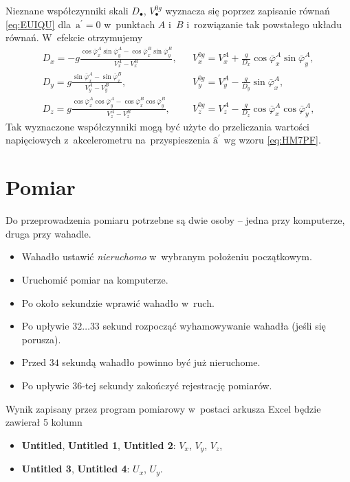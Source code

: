 \documentclass[paper=a4,DIV=12]{tmmlab}
\newcommand{\brm}[1]{\bm{\mathrm{#1}}}
\begin{document}
Nieznane współczynniki skali $D_{\bullet}$, $V_{\bullet}^{0g}$ wyznacza się
poprzez zapisanie równań \eqref{eq:EUIQU} dla~$\brm{a}^{\prime} = \brm{0}$
w~punktach $A$ i~$B$ i~rozwiązanie tak powstałego układu równań. W~efekcie
otrzymujemy
\begin{subequations}
  \label{eq:GN30K}
  \begin{align}
    & D_x = -g \frac{ \cos{\bar{\varphi}_x^A}\sin{\bar{\varphi}_y^A} -\cos{\bar{\varphi}_x^B}\sin{\bar{\varphi}_y^B} }
                    { V_x^A - V_x^B }, &
    & V_x^{0g} = V_x^A +\frac{g}{D_x} \cos{\bar{\varphi}_x^A}\sin{\bar{\varphi}_y^A}, &
    \label{eq:L8MQV}
    \\
    & D_y = g \frac{ \sin{\bar{\varphi}_x^A} - \sin{\bar{\varphi}_x^B} }
                   { V_y^A - V_y^B }, &
    & V_y^{0g} = V_y^A - \frac{g}{D_y}\sin{\bar{\varphi}_x^A}, &
    \label{eq:OAGGF}
    \\
    & D_z = g \frac{ \cos{\bar{\varphi}_x^A}\cos{\bar{\varphi}_y^A} -\cos{\bar{\varphi}_x^B}\cos{\bar{\varphi}_y^B} }
                    { V_z^A - V_z^B }, &
    & V_z^{0g} = V_z^A - \frac{g}{D_z} \cos{\bar{\varphi}_x^A}\cos{\bar{\varphi}_y^A}, &
    \label{eq:JZ38T}
  \end{align}
\end{subequations}
Tak wyznaczone współczynniki mogą być użyte do przeliczania wartości
napięciowych z~akcelerometru na~przyspieszenia $\hat{\brm{a}}^{\prime}$ 
wg wzoru \eqref{eq:HM7PF}.

\section{Pomiar}
\label{sec:CKUHT}

Do przeprowadzenia pomiaru potrzebne są dwie osoby -- jedna przy komputerze,
druga przy wahadle.
\begin{itemize}
  \item Wahadło ustawić {\em nieruchomo} w~wybranym położeniu początkowym.
  \item Uruchomić pomiar na komputerze.
  \item Po około sekundzie wprawić wahadło w~ruch.
  \item Po upływie $32\dots33$ sekund rozpocząć wyhamowywanie wahadła (jeśli się porusza).
  \item Przed $34$ sekundą wahadło powinno być już nieruchome.
  \item Po upływie $36$-tej sekundy zakończyć rejestrację pomiarów.
\end{itemize}
Wynik zapisany przez program pomiarowy w~postaci arkusza Excel będzie zawierał
5 kolumn
\begin{itemize}
  \item \textbf{Untitled}, \textbf{Untitled 1}, \textbf{Untitled 2}: $V_x$, $V_y$, $V_z$,
  \item \textbf{Untitled 3}, \textbf{Untitled 4}: $U_x$, $U_y$.
\end{itemize}
\end{document}
